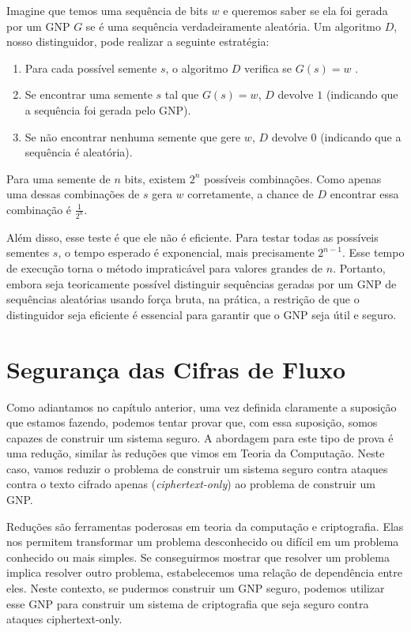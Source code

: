 Imagine que temos uma sequência de bits $w$ e queremos saber se ela foi gerada por um GNP $G$  se é uma sequência verdadeiramente aleatória.
Um algoritmo $D$, nosso distinguidor, pode realizar a seguinte estratégia:

\begin{enumerate}
    \item Para cada possível semente $s$, o algoritmo $D$ verifica se $G(s) = w$  . 
    \item Se encontrar uma semente $s$ tal que $G(s) = w$, $D$ devolve $1$ (indicando que a sequência foi gerada pelo GNP).
    \item Se não encontrar nenhuma semente que gere $w$, $D$ devolve $0$ (indicando que a sequência é aleatória).
\end{enumerate}

Para uma semente de $n$ bits, existem $2^n$ possíveis combinações.
Como apenas uma dessas combinações de $s$ gera $w$ corretamente, a chance de $D$ encontrar essa combinação é $\frac{1}{2^n}$.

Além disso, esse teste é que ele não é eficiente.
Para testar todas as possíveis sementes $s$, o tempo esperado é exponencial, mais precisamente $2^{n-1}$.
Esse tempo de execução torna o método impraticável para valores grandes de $n$.
Portanto, embora seja teoricamente possível distinguir sequências geradas por um GNP de sequências aleatórias usando força bruta, na prática, a restrição de que o distinguidor seja eficiente é essencial para garantir que o GNP seja útil e seguro.

\section{Segurança das Cifras de Fluxo}
\label{sec:streamcipher-sec}

Como adiantamos no capítulo anterior, uma vez definida claramente a suposição que estamos fazendo, podemos tentar provar que, com essa suposição, somos capazes de construir um sistema seguro.
A abordagem para este tipo de prova é uma redução, similar às reduções que vimos em Teoria da Computação.
Neste caso, vamos reduzir o problema de construir um sistema seguro contra ataques contra o texto cifrado apenas ({\em ciphertext-only}) ao problema de construir um GNP.

Reduções são ferramentas poderosas em teoria da computação e criptografia.
Elas nos permitem transformar um problema desconhecido ou difícil em um problema conhecido ou mais simples.
Se conseguirmos mostrar que resolver um problema implica resolver outro problema, estabelecemos uma relação de dependência entre eles.
Neste contexto, se pudermos construir um GNP seguro, podemos utilizar esse GNP para construir um sistema de criptografia que seja seguro contra ataques ciphertext-only.

